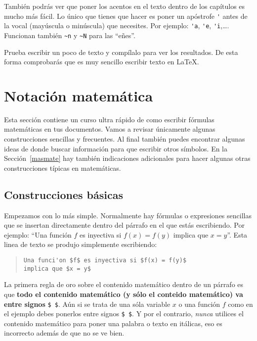 Tambi\'en podr\'as ver que poner los acentos en el texto dentro de los cap\'itulos es mucho m\'as f\'acil. Lo \'unico que 
tienes que hacer es poner un ap\'ostrofe \verb|'| antes de la vocal (may\'uscula o min\'uscula) que necesites. 
Por ejemplo: \verb|'a|, \verb|'e|, \verb|'i|,\dots. Funcionan tambi\'en \verb|~n| y \verb|~N| para las ``e\~nes''.

Prueba escribir un poco de texto y comp\'ilalo para ver los resultados. De esta forma comprobar\'as que es muy sencillo 
escribir texto en \LaTeX{}.


\section{Notaci\'on matem\'atica}\label{notacion}

Esta secci\'on contiene un curso ultra r\'apido de como escribir f\'ormulas matem\'aticas
en tus documentos. Vamos a revisar \'unicamente algunas construcciones sencillas y
frecuentes. Al final tambi\'en puedes encontrar algunas ideas de donde buscar informaci\'on para
que escribir otros s\'imbolos. En la Secci\'on~\ref{masmate} hay tambi\'en indicaciones
adicionales para hacer algunas otras construcciones t\'ipicas en matem\'aticas.


\subsection{Construcciones b\'asicas}

Empezamos con lo m\'as simple. Normalmente hay f\'ormulas o expresiones sencillas que se insertan
directamente dentro del p\'arrafo en el que est\'as escribiendo. Por ejemplo:
``Una funci\'on $f$ es inyectiva si $f(x) = f(y)$ implica que $x = y$''. Esta linea
de texto se produjo simplemente escribiendo:

\begin{quote}
\begin{verbatim}
Una funci'on $f$ es inyectiva si $f(x) = f(y)$
implica que $x = y$
\end{verbatim}
\end{quote}

La primera regla de oro sobre el contenido matem\'atico dentro de un p\'arrafo es que \textbf{todo el contenido 
matem\'atico (y s\'olo el conteido matem\'atico) va entre signos} \verb|$ $|. A\'un si se trata de una s\'ola variable 
$x$ o una funci\'on $f$ como en el ejemplo debes ponerlos entre signos \verb|$ $|. Y por el contrario, \emph{nunca}
utilices el contenido matem\'atico para poner una palabra o texto en it\'alicas, eso
es incorrecto adem\'as de que no se ve bien.

